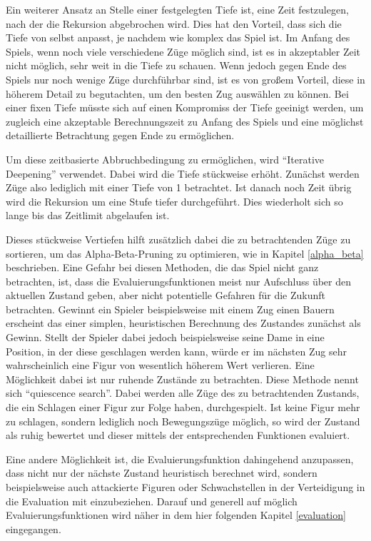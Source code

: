 Ein weiterer Ansatz an Stelle einer festgelegten Tiefe ist, eine Zeit festzulegen, nach der die Rekursion abgebrochen wird. Dies hat den Vorteil, dass sich die Tiefe von selbst anpasst, je nachdem wie komplex das Spiel ist. Im Anfang des Spiels, wenn noch viele verschiedene Züge möglich sind, ist es in akzeptabler Zeit nicht möglich, sehr weit in die Tiefe zu schauen. Wenn jedoch gegen Ende des Spiels nur noch wenige Züge durchführbar sind, ist es von großem Vorteil, diese in höherem Detail zu begutachten, um den besten Zug auswählen zu können. Bei einer fixen Tiefe müsste sich auf einen Kompromiss der Tiefe geeinigt werden, um zugleich eine akzeptable Berechnungszeit zu Anfang des Spiels und eine möglichst detaillierte Betrachtung gegen Ende zu ermöglichen.

Um diese zeitbasierte Abbruchbedingung zu ermöglichen, wird ``Iterative Deepening'' verwendet. Dabei wird die Tiefe stückweise erhöht. Zunächst werden Züge also lediglich mit einer Tiefe von 1 betrachtet. Ist danach noch Zeit übrig wird die Rekursion um eine Stufe tiefer durchgeführt. Dies wiederholt sich so lange bis das Zeitlimit abgelaufen ist. \cite{Russell2010}


Dieses stückweise Vertiefen hilft zusätzlich dabei die zu betrachtenden Züge zu sortieren, um das Alpha-Beta-Pruning zu optimieren, wie in Kapitel \ref{alpha_beta} beschrieben.
Eine Gefahr bei diesen Methoden, die das Spiel nicht ganz betrachten, ist, dass die Evaluierungsfunktionen meist nur Aufschluss über den aktuellen Zustand geben, aber nicht potentielle Gefahren für die Zukunft betrachten. Gewinnt ein Spieler beispielsweise mit einem Zug einen Bauern erscheint das einer simplen, heuristischen Berechnung des Zustandes zunächst als Gewinn. Stellt der Spieler dabei jedoch beispielsweise seine Dame in eine Position, in der diese geschlagen werden kann, würde er im nächsten Zug sehr wahrscheinlich eine Figur von wesentlich höherem Wert verlieren.
Eine Möglichkeit dabei ist nur ruhende Zustände zu betrachten. Diese Methode nennt sich ``quiescence search''. Dabei werden alle Züge des zu betrachtenden Zustands, die ein Schlagen einer Figur zur Folge haben, durchgespielt. Ist keine Figur mehr zu schlagen, sondern lediglich noch Bewegungszüge möglich, so wird der Zustand als ruhig bewertet und dieser mittels der entsprechenden Funktionen evaluiert. \cite{Russell2010} \label{quiescence}


Eine andere Möglichkeit ist, die Evaluierungsfunktion dahingehend anzupassen, dass nicht nur der nächste Zustand heuristisch berechnet wird, sondern beispielsweise auch attackierte Figuren oder Schwachstellen in der Verteidigung in die Evaluation mit einzubeziehen. Darauf und generell auf möglich Evaluierungsfunktionen wird näher in dem hier folgenden Kapitel \ref{evaluation} eingegangen.

